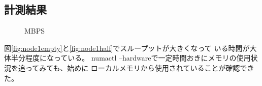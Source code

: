 \documentclass[11pt,a4paper]{jsarticle}
\newlength{\subfigwidth}
\newlength{\subfigcolsep}
\begin{document}
\subsection{計測結果}
\begin{figure}[thbp]
 \setlength{\subfigwidth}{.5\linewidth}
 \addtolength{\subfigwidth}{-.5\subfigcolsep}
 \begin{minipage}[b]{\subfigwidth}
 \end{minipage}
  \begin{minipage}[b]{\subfigwidth}
  \end{minipage}
  \caption{MBPS}
  \label{fig:countlineitem}
\end{figure}
図\ref{fig:node1empty}と\ref{fig:node1half}でスループットが大きくなって
いる時間が大体半分程度になっている。
numactl --hardwareで一定時間おきにメモリの使用状況を追ってみても、始めに
ローカルメモリから使用されていることが確認できた。

\clearpage
\end{document}
